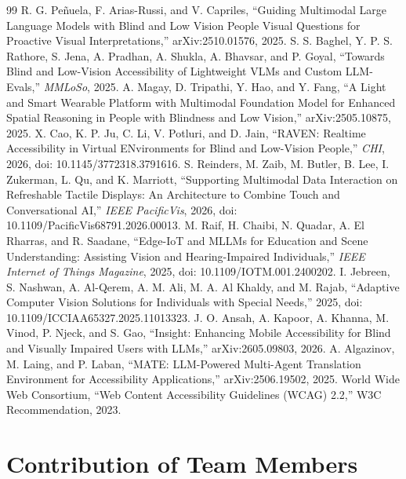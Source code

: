 \documentclass[12pt,a4paper,oneside]{report}
\begin{document}
\begin{thebibliography}{99}
 R. G. Pe\~nuela, F. Arias-Russi, and V. Capriles, ``Guiding Multimodal Large Language Models with Blind and Low Vision People Visual Questions for Proactive Visual Interpretations,'' arXiv:2510.01576, 2025.
 S. S. Baghel, Y. P. S. Rathore, S. Jena, A. Pradhan, A. Shukla, A. Bhavsar, and P. Goyal, ``Towards Blind and Low-Vision Accessibility of Lightweight VLMs and Custom LLM-Evals,'' \emph{MMLoSo}, 2025.
 A. Magay, D. Tripathi, Y. Hao, and Y. Fang, ``A Light and Smart Wearable Platform with Multimodal Foundation Model for Enhanced Spatial Reasoning in People with Blindness and Low Vision,'' arXiv:2505.10875, 2025.
 X. Cao, K. P. Ju, C. Li, V. Potluri, and D. Jain, ``RAVEN: Realtime Accessibility in Virtual ENvironments for Blind and Low-Vision People,'' \emph{CHI}, 2026, doi: 10.1145/3772318.3791616.
 S. Reinders, M. Zaib, M. Butler, B. Lee, I. Zukerman, L. Qu, and K. Marriott, ``Supporting Multimodal Data Interaction on Refreshable Tactile Displays: An Architecture to Combine Touch and Conversational AI,'' \emph{IEEE PacificVis}, 2026, doi: 10.1109/PacificVis68791.2026.00013.
 M. Raif, H. Chaibi, N. Quadar, A. El Rharras, and R. Saadane, ``Edge-IoT and MLLMs for Education and Scene Understanding: Assisting Vision and Hearing-Impaired Individuals,'' \emph{IEEE Internet of Things Magazine}, 2025, doi: 10.1109/IOTM.001.2400202.
 I. Jebreen, S. Nashwan, A. Al-Qerem, A. M. Ali, M. A. Al Khaldy, and M. Rajab, ``Adaptive Computer Vision Solutions for Individuals with Special Needs,'' 2025, doi: 10.1109/ICCIAA65327.2025.11013323.
 J. O. Ansah, A. Kapoor, A. Khanna, M. Vinod, P. Njeck, and S. Gao, ``Insight: Enhancing Mobile Accessibility for Blind and Visually Impaired Users with LLMs,'' arXiv:2605.09803, 2026.
 A. Algazinov, M. Laing, and P. Laban, ``MATE: LLM-Powered Multi-Agent Translation Environment for Accessibility Applications,'' arXiv:2506.19502, 2025.
 World Wide Web Consortium, ``Web Content Accessibility Guidelines (WCAG) 2.2,'' W3C Recommendation, 2023.
\end{thebibliography}

\appendix
{}
\chapter{Contribution of Team Members}
\end{document}
